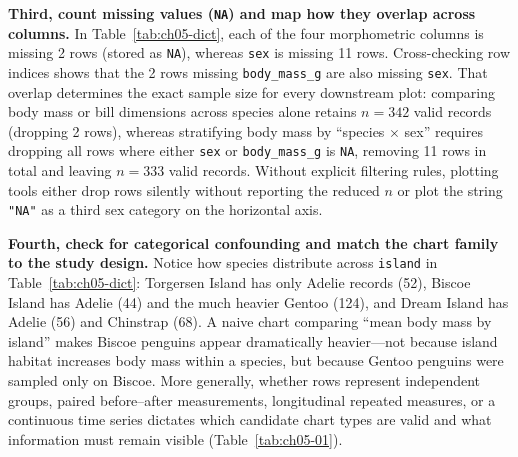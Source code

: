 \textbf{Third, count missing values (\texttt{NA}) and map how they overlap across columns.} In Table~\ref{tab:ch05-dict}, each of the four morphometric columns is missing 2 rows (stored as \texttt{NA}), whereas \texttt{sex} is missing 11 rows. Cross-checking row indices shows that the 2 rows missing \texttt{body\_mass\_g} are also missing \texttt{sex}. That overlap determines the exact sample size for every downstream plot: comparing body mass or bill dimensions across species alone retains $n = 342$ valid records (dropping 2 rows), whereas stratifying body mass by ``species $\times$ sex'' requires dropping all rows where either \texttt{sex} or \texttt{body\_mass\_g} is \texttt{NA}, removing 11 rows in total and leaving \textbf{$n = 333$} valid records. Without explicit filtering rules, plotting tools either drop rows silently without reporting the reduced $n$ or plot the string \texttt{"NA"} as a third sex category on the horizontal axis.

\textbf{Fourth, check for categorical confounding and match the chart family to the study design.} Notice how species distribute across \texttt{island} in Table~\ref{tab:ch05-dict}: Torgersen Island has only Adelie records (52), Biscoe Island has Adelie (44) and the much heavier Gentoo (124), and Dream Island has Adelie (56) and Chinstrap (68). A naive chart comparing ``mean body mass by island'' makes Biscoe penguins appear dramatically heavier—not because island habitat increases body mass within a species, but because Gentoo penguins were sampled only on Biscoe. More generally, whether rows represent independent groups, paired before--after measurements, longitudinal repeated measures, or a continuous time series dictates which candidate chart types are valid and what information must remain visible (Table~\ref{tab:ch05-01}).

